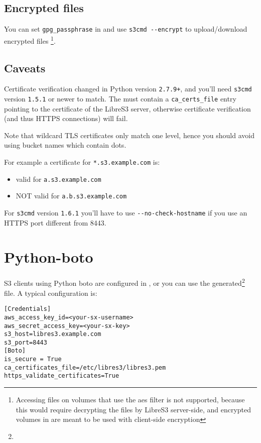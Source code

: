 \subsection{Encrypted files}

You can set \verb|gpg_passphrase| in  and use
\verb|s3cmd --encrypt| to upload/download encrypted files
\footnote{Accessing files on \SX volumes that use the aes filter is not supported, because
this would require decrypting the files by LibreS3 server-side, and encrypted volumes in \SX
are meant to be used with client-side encryption}.

\subsection{Caveats}

Certificate verification changed in Python version \verb|2.7.9+|, and you'll need
\verb|s3cmd| version \verb|1.5.1| or newer to match.
The  must contain a \verb|ca_certs_file| entry pointing to the certificate
of the LibreS3 server, otherwise certificate verification (and thus HTTPS
connections) will fail.

Note that wildcard TLS certificates only match one level, hence you should avoid
using bucket names which contain dots.

For example a certificate for \verb|*.s3.example.com| is:
\begin{itemize}
\item valid for \verb|a.s3.example.com| 
\item NOT valid for \verb|a.b.s3.example.com| 
\end{itemize}

For \verb|s3cmd| version \verb|1.6.1| you'll have to use \verb|--no-check-hostname| if you
use an HTTPS port different from 8443.

\section{Python-boto}
\label{sec:python-boto}

S3 clients using Python boto are configured in ,
or you can use the generated\footnote{} file.
A typical configuration is:

\begin{lstlisting}
[Credentials]
aws_access_key_id=<your-sx-username>
aws_secret_access_key=<your-sx-key>
s3_host=libres3.example.com
s3_port=8443
[Boto]
is_secure = True
ca_certificates_file=/etc/libres3/libres3.pem
https_validate_certificates=True
\end{lstlisting}

